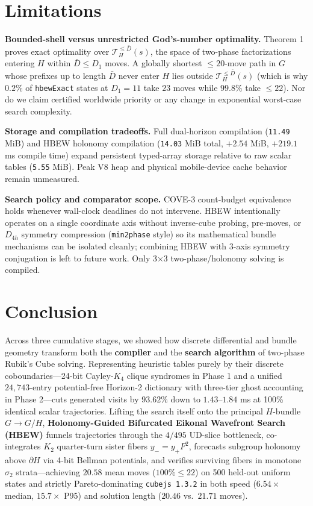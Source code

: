 \documentclass[10pt,twocolumn,letterpaper]{article}
\begin{document}
\hypertarget{limitations}{%
\section{Limitations}\label{limitations}}

\textbf{Bounded-shell versus unrestricted God's-number optimality.}
Theorem 1 proves exact optimality over \(\mathcal T_H^{\le \bar D}(s)\),
the space of two-phase factorizations entering \(H\) within
\(\bar D \le D_1\) moves. A globally shortest \(\le 20\)-move path in
\(G\) whose prefixes up to length \(\bar D\) never enter \(H\) lies
outside \(\mathcal T_H^{\le \bar D}(s)\) (which is why \(0.2\%\) of
\texttt{hbewExact} states at \(D_1=11\) take \(23\) moves while
\(99.8\%\) take \(\le 22\)). Nor do we claim certified worldwide
priority or any change in exponential worst-case search complexity.

\textbf{Storage and compilation tradeoffs.} Full dual-horizon
compilation (\texttt{11.49} MiB) and HBEW holonomy compilation
(\texttt{14.03} MiB total, \(+2.54\) MiB, \(+219.1\) ms compile time)
expand persistent typed-array storage relative to raw scalar tables
(\texttt{5.55} MiB). Peak V8 heap and physical mobile-device cache
behavior remain unmeasured.

\textbf{Search policy and comparator scope.} COVE-3 count-budget
equivalence holds whenever wall-clock deadlines do not intervene. HBEW
intentionally operates on a single coordinate axis without inverse-cube
probing, pre-moves, or \(D_{4h}\) symmetry compression
(\texttt{min2phase} style) so its mathematical bundle mechanisms can be
isolated cleanly; combining HBEW with 3-axis symmetry conjugation is
left to future work. Only 3×3 two-phase/holonomy solving is compiled.

\hypertarget{conclusion}{%
\section{Conclusion}\label{conclusion}}

Across three cumulative stages, we showed how discrete differential and
bundle geometry transform both the \textbf{compiler} and the
\textbf{search algorithm} of two-phase Rubik's Cube solving.
Representing heuristic tables purely by their discrete
coboundaries---24-bit Cayley-\(K_4\) clique syndromes in Phase 1 and a
unified \(24,743\)-entry potential-free Horizon-2 dictionary with
three-tier ghost accounting in Phase 2---cuts generated visits by
\(93.62\%\) down to \(1.43\)--\(1.84\) ms at 100\% identical scalar
trajectories. Lifting the search itself onto the principal \(H\)-bundle
\(G \to G/H\), \textbf{Holonomy-Guided Bifurcated Eikonal Wavefront
Search (HBEW)} funnels trajectories through the \(4/495\) UD-slice
bottleneck, co-integrates \(K_2\) quarter-turn sister fibers
\(y_- = y_+ F^2\), forecasts subgroup holonomy above \(\partial H\) via
4-bit Bellman potentials, and verifies surviving fibers in monotone
\(\sigma_2\) strata---achieving \(20.58\) mean moves (\(100\% \le 22\))
on 500 held-out uniform states and strictly Pareto-dominating
\texttt{cubejs\ 1.3.2} in both speed (\(6.54\times\) median,
\(15.7\times\) P95) and solution length (\(20.46\) vs.~\(21.71\) moves).



\end{document}
